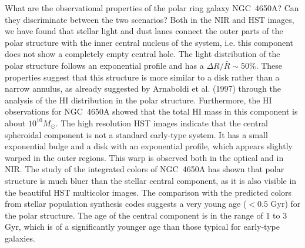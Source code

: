 \documentclass[preprint]{aastex}
\begin{document}
What are the observational properties of the polar ring galaxy NGC~4650A?
Can they discriminate between the two scenarios? 
Both in the NIR and HST images, we have found that stellar light and dust 
lanes connect the outer parts of the polar structure with the inner central 
nucleus of the system, i.e. this component does not
show a completely empty central hole. The light distribution of the polar 
structure follows an exponential profile and has a 
$\Delta R / \bar R \sim 50\%$. 
These properties suggest that this structure is more similar to a disk rather 
than a narrow annulus, as already suggested by Arnaboldi et al. (1997) 
through the analysis of the HI distribution in the polar structure. 
Furthermore,
the HI observations for NGC~4650A showed that the total HI mass in this
component is about $10^{10} M_\odot$.
The high resolution HST images indicate that the central spheroidal
component is not a standard early-type system. 
It has a small exponential bulge and a 
disk with an exponential profile, which appears slightly warped in 
the outer regions. This warp is observed both in the optical and in NIR.
The study of the integrated colors of NGC~4650A has shown that polar structure 
is much bluer than the stellar central component, as
it is also visible in the beautiful
HST multicolor images. The comparison with the predicted 
colors from stellar population synthesis codes suggests a very young 
age ($<0.5$ Gyr) for the polar structure. The age of the central 
component is in the range of $1$ to $3$ Gyr, which is of a
significantly younger age than those typical for early-type galaxies.
\end{document}
